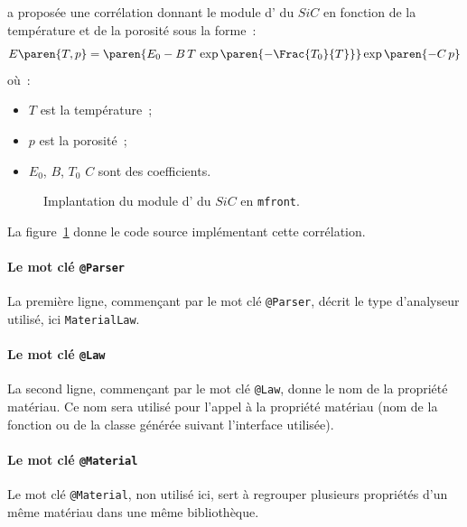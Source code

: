 \documentclass[12pt]{article}
\newcommand{\mfront}{\texttt{mfront}}
\newcommand{\sic}{$SiC$}
\newcommand{\code}[1]{
  \psframebox[linecolor=ceaorange,shadow=true,blur=true]{
    \begin{minipage}[htbp]{1.0\linewidth}
      \ttfamily\scriptsize #1
    \end{minipage}
  }
}
\begin{document}
 a proposée une corrélation donnant le module d' 
du \sic{} en fonction de la température et de la porosité 
sous la forme~:
\begin{equation}
  \label{eq:youngmodulussnead}
  E\paren{T,p} = \paren{E_{0}-B\,T\,\exp\paren{-\Frac{T_{0}}{T}}}\exp\paren{-C\,p}
\end{equation}
où~:
\begin{minipage}[t]{0.75\linewidth}
  \begin{itemize}
  \item \(T\) est la température~;
  \item \(p\) est la porosité~;
  \item \(E_{0}\), \(B\), \(T_{0}\) \(C\) sont des coefficients.
  \end{itemize}
\end{minipage}

\begin{figure}[htbp]
  \centering
  \code{{\ttfamily }}  
  \caption{Implantation du module d' du \sic{} en \mfront{}.}
  \label{fig:mfront_sic_youngmodulus}
\end{figure}

La figure~\ref{fig:mfront_sic_youngmodulus} donne le code source
implémentant cette corrélation.

\paragraph{Le mot clé \texttt{@Parser}} La première ligne, commençant
par le mot clé \texttt{@Parser}, décrit le type d'analyseur utilisé,
ici \texttt{MaterialLaw}.

\paragraph{Le mot clé \texttt{@Law}} La second ligne, commençant par
le mot clé \texttt{@Law}, donne le nom de la propriété matériau. Ce
nom sera utilisé pour l'appel à la propriété matériau (nom de la
fonction ou de la classe générée suivant l'interface utilisée).

\paragraph{Le mot clé \texttt{@Material}}  Le mot clé \texttt{@Material},
non utilisé ici, sert à regrouper plusieurs propriétés d'un même
matériau dans une même bibliothèque.
\end{document}

